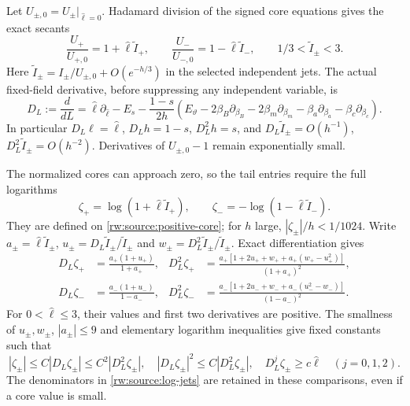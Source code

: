 Let $U_{\pm,0}=U_\pm|_{\widehat\ell=0}$. Hadamard division of the
signed core equations gives the exact secants
\begin{equation}\label{rw:source:secants}
 \frac{U_+}{U_{+,0}}=1+\widehat\ell\widetilde I_+,
 \qquad
 \frac{U_-}{U_{-,0}}=1-\widehat\ell\widetilde I_-,
 \qquad 1/3<\widetilde I_\pm<3.
\end{equation}
Here $\widetilde I_\pm=I_\pm/U_{\pm,0}
+O(e^{-h/3})$ in the selected independent jets. The actual
fixed-field derivative, before suppressing any independent variable,
is
\begin{equation}\label{rw:source:physical-D}
 D_L:=\frac d{dL}
 =\widehat\ell\partial_{\widehat\ell}-E_s
   -\frac{1-s}{2h}\left(E_\vartheta
       -2\beta_B\partial_{\beta_B}-2\beta_m\partial_{\beta_m}
       -\beta_a\partial_{\beta_a}-\beta_c\partial_{\beta_c}\right).
\end{equation}
In particular $D_L\widehat\ell=\widehat\ell$, $D_Lh=1-s$, $D_L^2h=s$,
and
$D_L\widetilde I_\pm=O(h^{-1})$,
$D_L^2\widetilde I_\pm=O(h^{-2})$. Derivatives of
$U_{\pm,0}-1$ remain exponentially small.

The normalized cores can approach zero, so the tail entries require
the full logarithms
\[
 \zeta_+=\log(1+\widehat\ell\widetilde I_+),\qquad
 \zeta_-=-\log(1-\widehat\ell\widetilde I_-).
\]
They are defined on \eqref{rw:source:positive-core}; for $h$ large,
$|\zeta_\pm|/h<1/1024$. Write
$a_\pm=\widehat\ell\widetilde I_\pm$,
$u_\pm=D_L\widetilde I_\pm/\widetilde I_\pm$ and
$w_\pm=D_L^2\widetilde I_\pm/\widetilde I_\pm$.
Exact differentiation gives
\begin{equation}\label{rw:source:log-jets}
\begin{aligned}
 D_L\zeta_+&=\frac{a_+(1+u_+)}{1+a_+},
 &D_L^2\zeta_+&=
 \frac{a_+[1+2u_++w_++a_+(w_+-u_+^2)]}{(1+a_+)^2},\\
 D_L\zeta_-&=\frac{a_-(1+u_-)}{1-a_-},
 &D_L^2\zeta_-&=
 \frac{a_-[1+2u_-+w_-+a_-(u_-^2-w_-)]}{(1-a_-)^2}.
\end{aligned}
\end{equation}
For $0<\widehat\ell\le3$, their values and first two derivatives are
positive. The smallness of $u_\pm,w_\pm$, $|a_\pm|\le9$ and
elementary logarithm inequalities give fixed constants such that
\begin{equation}\label{rw:source:log-comparison}
 |\zeta_\pm|\le C|D_L\zeta_\pm|\le C^2|D_L^2\zeta_\pm|,
 \quad |D_L\zeta_\pm|^2\le C|D_L^2\zeta_\pm|,
 \quad D_L^j\zeta_\pm\ge c\widehat\ell\quad(j=0,1,2).
\end{equation}
The denominators in \eqref{rw:source:log-jets} are retained in
these comparisons, even if a core value is small.

